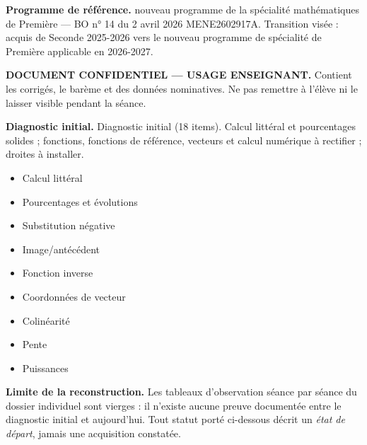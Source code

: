 \documentclass[10pt,a4paper]{article}
\begin{document}
\begin{methodbox}\small\textbf{Programme de référence.} nouveau programme de la spécialité mathématiques de Première --- BO n° 14 du 2 avril 2026 MENE2602917A. Transition visée : acquis de Seconde 2025-2026 vers le nouveau programme de spécialité de Première applicable en 2026-2027.\end{methodbox}
\begin{keybox}\textbf{DOCUMENT CONFIDENTIEL --- USAGE ENSEIGNANT.} Contient les corrigés, le barème et des données nominatives. Ne pas remettre à l'élève ni le laisser visible pendant la séance.\end{keybox}
\begin{methodbox}
\textbf{Diagnostic initial.} Diagnostic initial (18 items). Calcul littéral et pourcentages solides ; fonctions, fonctions de référence, vecteurs et calcul numérique à rectifier ; droites à installer.
\end{methodbox}
\begin{itemize}\item Calcul littéral\item Pourcentages et évolutions\end{itemize}
\begin{itemize}\item Substitution négative\item Image/antécédent\item Fonction inverse\item Coordonnées de vecteur\item Colinéarité\item Pente\item Puissances\end{itemize}
\begin{warningbox}\textbf{Limite de la reconstruction.} Les tableaux d'observation séance par séance du dossier individuel sont vierges : il n'existe aucune preuve documentée entre le diagnostic initial et aujourd'hui. Tout statut porté ci-dessous décrit un \emph{état de départ}, jamais une acquisition constatée.\end{warningbox}
\newpage{}
\end{document}
